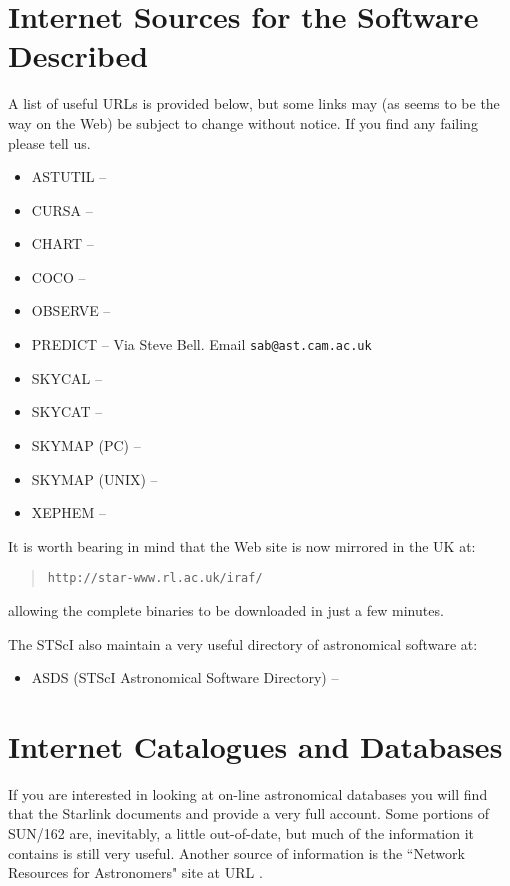 \section{Internet Sources for the Software Described} 
\label{sec:sourcessoft}
 
A list of useful URLs is provided below, but some links may (as seems to be
the way on the Web) be subject to change without notice. If you find any
failing please tell us. 

\begin{itemize}
\item ASTUTIL -- {\HTTPBref} 
\item CURSA --  {\HTTPBDref}
\item CHART -- {\HTTPBEref}
\item COCO -- {\HTTPAref}
\item OBSERVE -- {\HTTPAref}             
\item PREDICT -- Via Steve Bell. Email {\tt sab@ast.cam.ac.uk}          
\item SKYCAL -- {\HTTPAref}         
\item SKYCAT -- {\HTTPMref}   
\item SKYMAP (PC) -- {\HTTPCref} 
\item SKYMAP (UNIX) -- {\HTTPNref} 
\item XEPHEM -- {\HTTPBref} 
\end{itemize}

It is worth bearing in mind that the {\IRAFref} Web site is now mirrored 
in the UK at:
\begin{quote}
{\tt http://star-www.rl.ac.uk/iraf/}
\end{quote}
allowing the complete binaries to be downloaded in just a few minutes. 

The STScI also maintain a very useful directory of astronomical software at:

\begin{itemize}
\item ASDS (STScI Astronomical Software Directory) -- {\HTTPOref} 
\end{itemize}

\section{Internet Catalogues and Databases} 
\label{sec:catalogue}
 
If you are interested in looking at on-line astronomical databases you
will find that the Starlink documents {\SUNCATref} and {\SUNCATBref} provide a very full account. 
Some portions of SUN/162 are, inevitably, a little out-of-date, but much of the information
it contains is still very useful. Another source of information is
the ``Network Resources for Astronomers" site at URL
{\HTTPBFref}.


